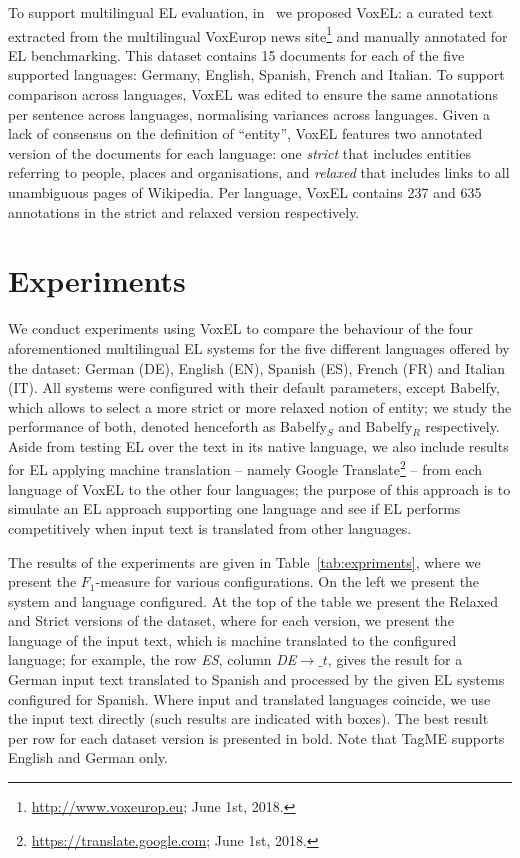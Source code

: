 \documentclass{llncs}
\begin{document}
To support multilingual EL evaluation, in~\cite{ourISWC} we proposed VoxEL: a curated text extracted from the multilingual VoxEurop news site\footnote{\url{http://www.voxeurop.eu}; June 1st, 2018.} and manually annotated for EL benchmarking. This dataset contains 15 documents for each of the five supported languages: Germany, English, Spanish, French and Italian. To support comparison across languages, VoxEL was edited to ensure the same annotations per sentence across languages, normalising variances across languages. Given a lack of consensus on the definition of ``entity'', VoxEL features two annotated version of the documents for each language: one \textit{strict} that includes entities referring to people, places and organisations, and \textit{relaxed} that includes links to all unambiguous pages of Wikipedia. Per language, VoxEL contains 237 and 635 annotations in the strict and relaxed version respectively.

\section{Experiments}

We conduct experiments using VoxEL to compare the behaviour of the four aforementioned multilingual EL systems for the five different languages offered by the dataset: German (DE), English (EN), Spanish (ES), French (FR) and Italian (IT). All systems were configured with their default parameters, except Babelfy, which allows to select a more strict or more relaxed notion of entity; we study the performance of both, denoted henceforth as Babelfy$_S$ and Babelfy$_R$ respectively. Aside from testing EL over the text in its native language, we also include results for EL applying machine translation -- namely Google Translate\footnote{\url{https://translate.google.com}; June 1st, 2018.} -- from each language of VoxEL to the other four languages; the purpose of this approach is to simulate an EL approach supporting one language and see if EL performs competitively when input text is translated from other languages. 

The results of the experiments are given in Table~\ref{tab:expriments}, where we present the $F_1$-measure for various configurations. On the left we present the system and language configured. At the top of the table we present the Relaxed and Strict versions of the dataset, where for each version, we present the language of the input text, which is machine translated to the configured language; for example, the row \textit {ES}, column \textit{DE$\rightarrow{}\_t$}, gives the result for a German input text translated to Spanish and processed by the given EL systems configured for Spanish. Where input and translated languages coincide, we use the input text directly (such results are indicated with boxes). The best result per row for each dataset version is presented in bold. Note that TagME supports English and German only.
\end{document}

